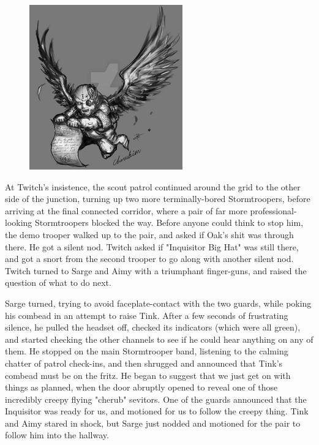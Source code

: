 \begin{figure}
	\begin{center}
		\includegraphics[width=\figwidth]{pics/21/79.png}
	\end{center}
\end{figure}
At Twitch's insistence, the scout patrol continued around the grid to the other side of the junction, turning up two more terminally-bored Stormtroopers, before arriving at the final connected corridor, where a pair of far more professional-looking Stormtroopers blocked the way. 
Before anyone could think to stop him, the demo trooper walked up to the pair, and asked if Oak's shit was through there. 
He got a silent nod. 
Twitch asked if "Inquisitor Big Hat" was still there, and got a snort from the second trooper to go along with another silent nod. 
Twitch turned to Sarge and Aimy with a triumphant finger-guns, and raised the question of what to do next. 


Sarge turned, trying to avoid faceplate-contact with the two guards, while poking his combead in an attempt to raise Tink. 
After a few seconds of frustrating silence, he pulled the headset off, checked its indicators (which were all green), and started checking the other channels to see if he could hear anything on any of them. 
He stopped on the main Stormtrooper band, listening to the calming chatter of patrol check-ins, and then shrugged and announced that Tink's combead must be on the fritz. 
He began to suggest that we just get on with things as planned, when the door abruptly opened to reveal one of those incredibly creepy flying "cherub" sevitors. 
One of the guards announced that the Inquisitor was ready for us, and motioned for us to follow the creepy thing. 
Tink and Aimy stared in shock, but Sarge just nodded and motioned for the pair to follow him into the hallway.

